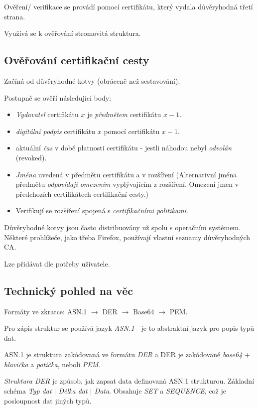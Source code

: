 \documentclass[10pt,a4paper]{article}
\begin{document}
Ověření/ verifikace se provádí pomocí certifikátu, který vydala důvěryhodná třetí strana.

Využívá se k ověřování stromovitá struktura.

\subsection{Ověřování certifikační cesty}
Začíná od důvěryhodné kotvy (obráceně než sestavování).

Postupně se ověří následující body:
\begin{itemize}\setlength\itemsep{0em}
    \item \textit{Vydavatel} certifikátu $x$ je \textit{předmětem} certifikátu $x-1$. 
    \item \textit{digitální podpis} certifikátu $x$ pomocí certifikátu $x-1$.
    \item aktuální \textit{čas} v době platnosti certifikátu - jestli náhodou nebyl \textit{odvolán} (revoked).
    \item \textit{Jména} uvedená v předmětu certifikátu a v rozšíření (Alternativní jména předmětu \textit{odpovídají omezením} vyplývajícím z rozšíření. Omezení jmen v předchozích certifikátech certifikační cesty.)
    \item Verifikují se rozšíření spojená s \textit{certifikačními politikami}.
\end{itemize}


Důvěryhodné kotvy jsou často distribuovány už spolu s operačním systémem.
Některé prohlížeče, jako třeba Firefox, používají vlastní seznamy důvěryhodných CA.

Lze přidávat dle potřeby uživatele.

\subsection{Technický pohled na věc}
Formáty ve zkratce: ASN.1 $ \to $ DER $ \to $ Base64 $ \to $ PEM.

Pro zápis struktur se používá jazyk \textit{ASN.1} - je to  abstraktní jazyk pro popis typů dat.

ASN.1 je struktura zakódovaná ve formátu \textit{DER} a DER je zakódované \textit{base64} + \textit{hlavička} a \textit{patička}, neboli \textit{PEM}.

\textit{Struktura DER} je způsob, jak zapsat data definovaná ASN.1 strukturou. 
Základní schéma \textit{Typ dat $ \mid $ Délka dat $ \mid $ Data}. Obsahuje \textit{SET} a \textit{SEQUENCE}, což je posloupnost dat jiných typů.
\end{document}

